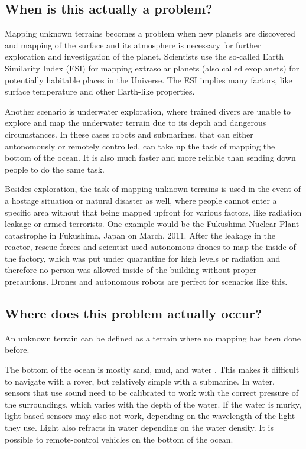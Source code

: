 \subsection{When is this actually a problem?}
Mapping unknown terrains becomes a problem when new planets are discovered and mapping of the surface and its atmosphere is necessary for further exploration and investigation of the planet. Scientists use the so-called Earth Similarity Index (ESI) for mapping extrasolar planets (also called exoplanets) for potentially habitable places in the Universe\cite{exoplanets}\cite{esi}. The ESI implies many factors, like surface temperature and other Earth-like properties. 

Another scenario is underwater exploration, where trained divers are unable to explore and map the underwater terrain due to its depth and dangerous circumstances. In these cases robots and submarines, that can either autonomously or remotely controlled, can take up the task of mapping the bottom of the ocean. It is also much faster and more reliable than sending down people to do the same task.

Besides exploration, the task of mapping unknown terrains is used in the event of a hostage situation or natural disaster as well, where people cannot enter a specific area without that being mapped upfront for various factors, like radiation leakage or armed terrorists. One example would be the Fukushima Nuclear Plant catastrophe in Fukushima, Japan on March, 2011. After the leakage in the reactor, rescue forces and scientist used autonomous drones to map the inside of the factory\cite{fukushima}, which was put under quarantine for high levels or radiation and therefore no person was allowed inside of the building without proper precautions. Drones and autonomous robots are perfect for scenarios like this.

\clearpage
\subsection{Where does this problem actually occur?}
An unknown terrain can be defined as a terrain where no mapping has been done before.

The bottom of the ocean is mostly sand, mud, and water %
. This makes it difficult to navigate with a rover, but relatively simple with a submarine. In water, sensors that use sound need to be calibrated to work with the correct pressure of the surroundings, which varies with the depth of the water. If the water is murky, light-based sensors may also not work, depending on the wavelength of the light they use. Light also refracts in water depending on the water density. It is possible to remote-control vehicles on the bottom of the ocean. %

